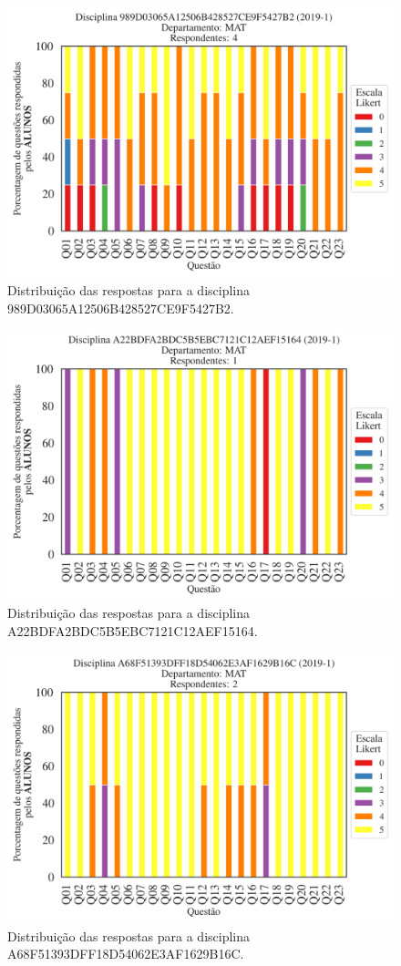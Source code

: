 \documentclass[a4paper,10pt]{article}
\begin{document}
\begin{figure}[h]
\centering
\includegraphics[width=0.485\linewidth]{analise_disciplina_departamento_MAT_ALUNO_TURMA_989D03065A12506B428527CE9F5427B2.png}
\caption{\label{fig:analise_geral_departamento}                Distribuição das respostas para a disciplina 989D03065A12506B428527CE9F5427B2.}
\end{figure}
\begin{figure}[h]
\centering
\includegraphics[width=0.485\linewidth]{analise_disciplina_departamento_MAT_ALUNO_TURMA_A22BDFA2BDC5B5EBC7121C12AEF15164.png}
\caption{\label{fig:analise_geral_departamento}                Distribuição das respostas para a disciplina A22BDFA2BDC5B5EBC7121C12AEF15164.}
\end{figure}
\begin{figure}[h]
\centering
\includegraphics[width=0.485\linewidth]{analise_disciplina_departamento_MAT_ALUNO_TURMA_A68F51393DFF18D54062E3AF1629B16C.png}
\caption{\label{fig:analise_geral_departamento}                Distribuição das respostas para a disciplina A68F51393DFF18D54062E3AF1629B16C.}
\end{figure}
\end{document}
